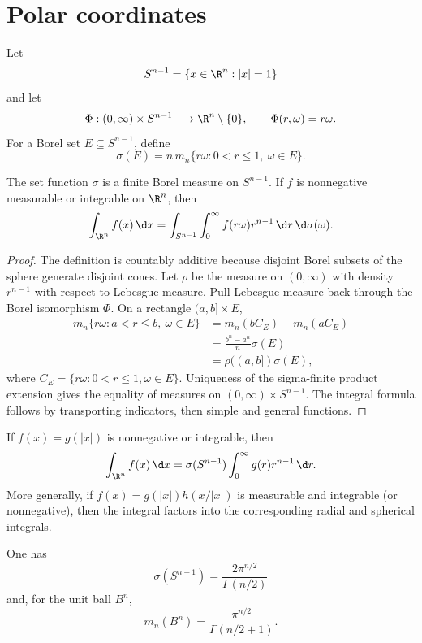 \section{Polar coordinates}

\begin{de}
Let
\[
S^{n-1}=\{x\in\R^n:|x|=1\}
\]
and let
\[
\Phi:(0,\infty)\times S^{n-1}\longrightarrow\R^n\setminus\{0\},
\qquad
\Phi(r,\omega)=r\omega.
\]
For a Borel set $E\subseteq S^{n-1}$, define
\[
\sigma(E)
 =n\,m_n\{r\omega:0<r\leq1,\ \omega\in E\}.
\]
\end{de}

\begin{thm}
The set function $\sigma$ is a finite Borel measure on $S^{n-1}$. If $f$ is nonnegative measurable or integrable on $\R^n$, then
\[
\int_{\R^n}f(x)\,\d x
 =\int_{S^{n-1}}\int_0^\infty
   f(r\omega)r^{n-1}\,\d r\,\d\sigma(\omega).
\]
\end{thm}

\begin{proof}
The definition is countably additive because disjoint Borel subsets of the sphere generate disjoint cones. Let $\rho$ be the measure on $(0,\infty)$ with density $r^{n-1}$ with respect to Lebesgue measure. Pull Lebesgue measure back through the Borel isomorphism $\Phi$. On a rectangle $(a,b]\times E$,
\begin{align*}
m_n\{r\omega:a<r\leq b,\ \omega\in E\}
 &=m_n(bC_E)-m_n(aC_E)\\
 &=\frac{b^n-a^n}{n}\sigma(E)\\
 &=\rho((a,b])\sigma(E),
\end{align*}
where $C_E=\{r\omega:0<r\leq1,\omega\in E\}$. Uniqueness of the sigma-finite product extension gives the equality of measures on $(0,\infty)\times S^{n-1}$. The integral formula follows by transporting indicators, then simple and general functions.
\end{proof}

\begin{cor}
If $f(x)=g(|x|)$ is nonnegative or integrable, then
\[
\int_{\R^n}f(x)\,\d x
 =\sigma(S^{n-1})\int_0^\infty g(r)r^{n-1}\,\d r.
\]
More generally, if $f(x)=g(|x|)h(x/|x|)$ is measurable and integrable (or nonnegative), then the integral factors into the corresponding radial and spherical integrals.
\end{cor}

\begin{prop}
One has
\[
\sigma(S^{n-1})=\frac{2\pi^{n/2}}{\Gamma(n/2)}
\]
and, for the unit ball $B^n$,
\[
m_n(B^n)=\frac{\pi^{n/2}}{\Gamma(n/2+1)}.
\]
\end{prop}

